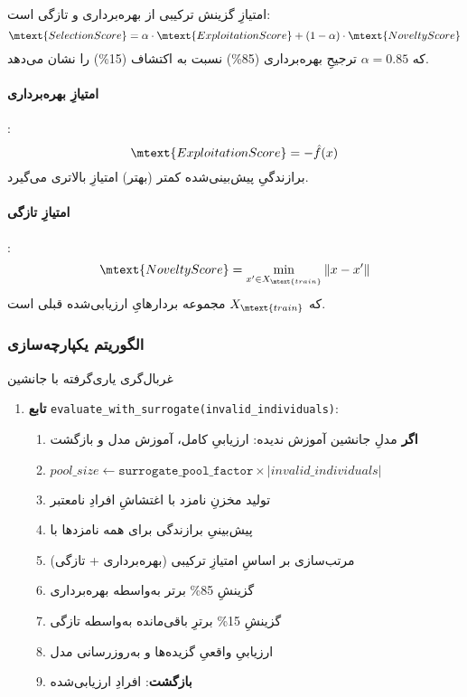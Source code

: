 امتیازِ گزینش ترکیبی از بهره‌برداری و تازگی است:
\begin{equation}\label{Eq.surrogate_selection}
\mtext{Selection Score} = \alpha \cdot \mtext{Exploitation Score} + (1-\alpha) \cdot \mtext{Novelty Score}
\end{equation}
که \(\alpha = 0.85\) ترجیحِ بهره‌برداری (85\%) نسبت به اکتشاف (15\%) را نشان می‌دهد.

\paragraph{امتیازِ بهره‌برداری}:
\begin{equation}\label{Eq.exploitation_score}
\mtext{Exploitation Score} = -\hat{f}(x)
\end{equation}
برازندگیِ پیش‌بینی‌شده کمتر (بهتر) امتیازِ بالاتری می‌گیرد.

\paragraph{امتیازِ تازگی}:
\begin{equation}\label{Eq.novelty_score}
\mtext{Novelty Score} = \min_{x' \in X_{\mtext{train}}} \|x - x'\|
\end{equation}
که \(X_{\mtext{train}}\) مجموعه بردارهایِ ارزیابی‌شده قبلی است.

\subsubsection{الگوریتم یکپارچه‌سازی}

\begin{algorithm}
\caption{غربال‌گری یاری‌گرفته با جانشین}
\begin{enumerate}
\item \textbf{تابع} \texttt{evaluate\_with\_surrogate(invalid\_individuals)}:
  \begin{enumerate}
  \item \textbf{اگر} مدلِ جانشین آموزش ندیده: ارزیابیِ کامل، آموزش مدل و بازگشت
  \item \(pool\_size \leftarrow \texttt{surrogate\_pool\_factor} \times |invalid \_individuals|\)
  \item تولید مخزنِ نامزد با اغتشاشِ افرادِ نامعتبر
  \item پیش‌بینیِ برازندگی برای همه نامزدها با 
  \item مرتب‌سازی بر اساسِ امتیازِ ترکیبی (بهره‌برداری + تازگی)
  \item گزینشِ 85\% برتر به‌واسطه بهره‌برداری
  \item گزینشِ 15\% برترِ باقی‌مانده به‌واسطه تازگی
  \item ارزیابیِ واقعیِ گزیده‌ها و به‌روزرسانی مدل
  \item \textbf{بازگشت}: افرادِ ارزیابی‌شده
  \end{enumerate}
\end{enumerate}
\end{algorithm}

